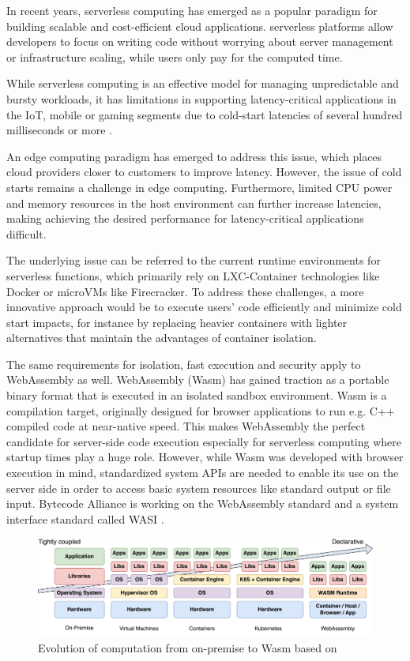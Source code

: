 In recent years, \gls{serverless} computing has emerged as a popular paradigm for building scalable and cost-efficient cloud applications. \Gls{serverless} platforms allow developers to focus on writing code without worrying about server management or infrastructure scaling, while users only pay for the computed time.

While \gls{serverless} computing is an effective model for managing unpredictable and bursty
workloads, it has limitations in supporting latency-critical applications in the IoT, mobile or gaming segments due to cold-start latencies of several hundred milliseconds or more \cite{gackstatter_2022_pushing}. 

An \gls{edge computing} paradigm has emerged to address this issue, which places cloud providers closer to customers to improve latency. However, the issue of cold starts remains a challenge in edge computing. Furthermore, limited CPU power and memory resources in the host environment can further increase latencies, making achieving the desired performance for latency-critical applications difficult.

The underlying issue can be referred to the current runtime environments for \gls{serverless} functions, which primarily rely on \Gls{LXC-Container} technologies like Docker or microVMs like Firecracker. To address these challenges, a more innovative approach would be to execute users' code efficiently and minimize cold start impacts, for instance by replacing heavier containers with lighter alternatives that maintain the advantages of container isolation.

The same requirements for isolation, fast execution and security apply to \gls{WebAssembly} as well. \Gls{WebAssembly} (Wasm) has gained traction as a portable binary format that is executed in an isolated sandbox environment. Wasm is a compilation target, originally designed for browser applications to run e.g. C++ compiled code at near-native speed. This makes WebAssembly the perfect candidate for server-side code execution especially for serverless computing where startup times play a huge role. However, while Wasm was developed with browser execution in mind, standardized system APIs are needed to enable its use on the server side in order to access basic system resources like standard output or file input. Bytecode Alliance is working on the WebAssembly standard and a system interface standard called WASI \cite{webassembly_2023_webassemblywasi}.

\begin{figure}[H]
	\centering
		\includegraphics[width=\textwidth,height=\textheight,keepaspectratio]{images/introduction/Cloud_Transformation.pdf}
	\caption{Evolution of computation from on-premise to Wasm based on \cite{randall_2021_wasmcloud}}
	\label{fig:cloud-transformation}
\end{figure}

